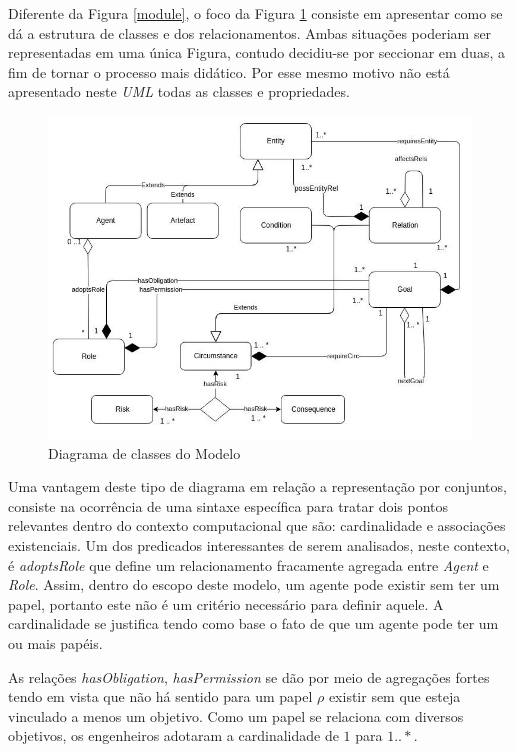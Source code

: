 Diferente da Figura \ref{module}, o foco da Figura \ref{classdiagrama} consiste em apresentar como se dá a estrutura de classes e dos relacionamentos. Ambas situações poderiam ser representadas em uma única Figura, contudo decidiu-se por seccionar em duas, a fim de tornar o processo mais didático. Por esse mesmo motivo não está apresentado neste \textit{UML} todas as classes e propriedades.  

\begin{figure}[H]
  \centering
  \includegraphics[width=1\linewidth]{figure/Class.jpg} 
  \caption{Diagrama de classes do Modelo }
  \label{classdiagrama}
\end{figure}

Uma vantagem deste tipo de diagrama em relação a representação por conjuntos, consiste na ocorrência de uma sintaxe específica para tratar dois pontos relevantes dentro do contexto computacional que são: cardinalidade e associações existenciais. Um dos predicados interessantes de serem analisados, neste contexto, é \textit{adoptsRole} que define um relacionamento fracamente agregada entre \textit{Agent} e \textit{Role}. Assim, dentro do escopo deste modelo, um agente pode existir sem ter um papel, portanto este não é um critério necessário para definir aquele. A cardinalidade se justifica tendo como base o fato de que um agente pode ter um ou mais papéis. 

As relações \textit{hasObligation}, \textit{hasPermission} se dão por meio de agregações fortes tendo em vista que não há sentido para um papel $\rho$ existir sem que esteja vinculado a menos um objetivo. Como um papel se relaciona com diversos objetivos, os engenheiros adotaram a cardinalidade de $1$ para $1 .. *$.

